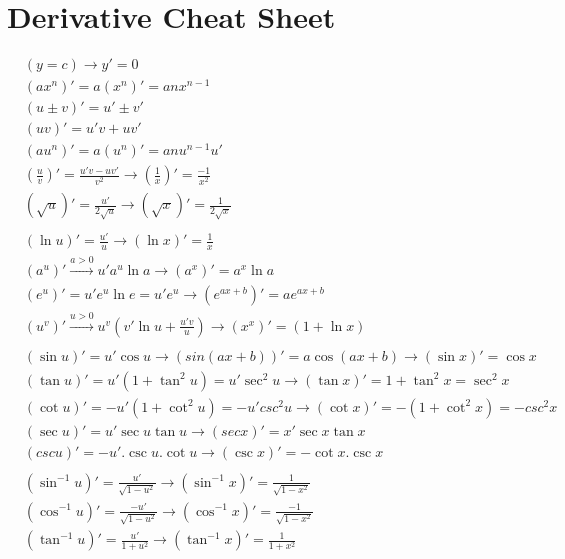 \newpage
\section{Derivative Cheat Sheet}
\begin{multicols}{2}
\begin{align*}
&(y = c) \longrightarrow y' = 0 \\
&(ax^n)' = a(x^n)' = anx^{n-1} \\
&(u \pm v)' = u' \pm v' \\
&(uv)' = u'v + uv' \\
&(au^n)' = a(u^n)' = anu^{n-1}u' \\
&(\frac{u}{v})' = \frac{u'v - uv'}{v^2} \longrightarrow (\frac{1}{x})' = \frac{-1}{x^2} \\
&(\sqrt{u})' = \frac{u'}{2\sqrt{u}} \longrightarrow (\sqrt{x})' = \frac{1}{2\sqrt{x}} \\
\\
&(\ln u)' = \frac{u'}{u} \longrightarrow (\ln x)' = \frac{1}{x}  \\
&(a^u)' \overset{a>0}{\longrightarrow} u'a^u\ln a \longrightarrow (a^x)' = a^x\ln a \\
&(e^u)' = u'e^u\ln e = u'e^u \longrightarrow (e^{ax+b})' = ae^{ax+b} \\
&(u^v)' \overset{u>0}{\longrightarrow} u^v(v'\ln u+\frac{u'v}{u}) \longrightarrow (x^x)' = (1 + \ln x) \\
\\
&(\sin u)' = u'\cos u \longrightarrow (sin(ax+b))' = a \cos(ax+b) \longrightarrow (\sin x)' = \cos x \\
&(\tan u)' = u'(1+\tan^2u) = u'\sec^2u \longrightarrow (\tan x)' = 1+\tan^2 x = \sec^2 x \\
&(\cot u)' = -u'(1+\cot^2u) = -u'csc^2u \longrightarrow (\cot x)' = -(1+\cot^2x) = -csc^2x \\
&(\sec u)' = u'\sec u \tan u \longrightarrow (sec x)' = x'\sec x\tan x \\
&(csc u)' = -u'.\csc u.\cot u \longrightarrow (\csc x)' = -\cot x.\csc x \\
\\
&(\sin^{-1} u)' = \frac{u'}{\sqrt{1-u^2}} \longrightarrow (\sin^{-1}x)' = \frac{1}{\sqrt{1-x^2}} \\
&(\cos^{-1} u)' = \frac{-u'}{\sqrt{1-u^2}} \longrightarrow (\cos^{-1}x)' = \frac{-1}{\sqrt{1-x^2}} \\
&(\tan^{-1} u)' = \frac{u'}{1+u^2} \longrightarrow (\tan^{-1}x)' = \frac{1}{1+x^2} \\

\end{align*}
\end{multicols}
